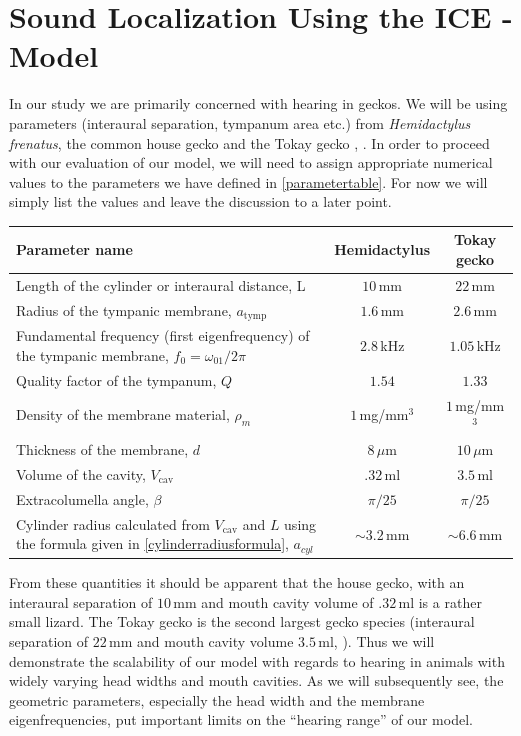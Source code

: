 \section{Sound Localization Using the ICE -Model}\label{localizationsection}
In our study we are primarily concerned with hearing in geckos. We will be using
parameters (interaural separation, tympanum area etc.) from \emph{Hemidactylus frenatus}, the common house gecko
\cite{dalsgaardmanley2} and the Tokay gecko \cite{dalsgaardmanley1}, \cite{dalsgaardtangcarr}. In order to proceed
with our evaluation of our model, we will need to assign appropriate numerical values to the parameters we have
defined in \ref{parametertable}. For now we will simply list the values and leave the discussion to a later point.

\vspace{\baselineskip}
\noindent
\begin{minipage}{\linewidth}
\renewcommand{\arraystretch}{1.3}
\centering
{}\label{geckogeometricparams}
\begin{tabular}{|p{8.5 cm} | c | c|}
\hline
Parameter name & Hemidactylus & Tokay gecko\\
\hline
Length of the cylinder or interaural distance, L & $10\,$mm & $22\,$mm\\
Radius of the tympanic membrane, $a_{\mathrm{tymp}}$& $1.6\,$mm & $2.6\,$mm\\
Fundamental frequency (first eigenfrequency) of the tympanic membrane, $f_0=\omega_{01}/2\pi$ & $2.8\,$kHz & $1.05\,$kHz\\
Quality factor of the tympanum, $Q$ & $1.54$ &  $1.33$\\
Density of the membrane material, $\rho_m$ & $1\,$mg/mm$^3$ & $1\,$mg/mm$^3$\\
Thickness of the membrane, $d$& $8\,\mu$m & $10\,\mu$m\\
Volume of the cavity, $V_{\mathrm{\mathrm{cav}}}$ & $.32\,$ml & $3.5\,$ml\\ 
Extracolumella angle, $\beta$ & $\pi/25$ & $\pi/25$\\
Cylinder radius calculated from $V_{\mathrm{\mathrm{cav}}}$ and $L$ using the formula given in \eqref{cylinderradiusformula}, $a_{cyl}$ & $\sim 3.2\,$mm  &$\sim 6.6\,$mm \\
\hline
\end {tabular}\par
\bigskip
\end{minipage}
From these quantities it should be apparent that the house gecko, with an interaural separation of $10\,$mm and mouth cavity volume of $.32\,$ml is a rather
small lizard. The Tokay gecko is the second largest gecko species (interaural separation of $22\,$mm and mouth cavity volume $3.5\,$ml, \cite{dalsgaardmanley2}).
Thus we will demonstrate the scalability of our model with regards to hearing in animals with widely varying head widths and mouth cavities. As we will subsequently see, the geometric parameters, especially
the head width and the membrane eigenfrequencies, put important limits on the ``hearing range'' of our model.

